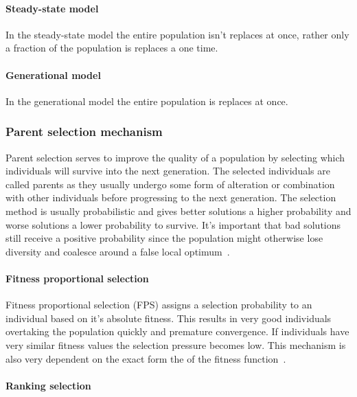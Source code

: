 \paragraph{Steady-state model}

In the steady-state model the entire population isn't replaces at once, rather only a fraction of the population is replaces a one time.

\paragraph{Generational model}

In the generational model the entire population is replaces at once.

\subsubsection{Parent selection mechanism}

Parent selection serves to improve the quality of a population by selecting which individuals will survive into the next generation. The selected individuals are called parents as they usually undergo some form of alteration or combination with other individuals before progressing to the next generation. The selection method is usually probabilistic and gives better solutions a higher probability and worse solutions a lower probability to survive. It's important that bad solutions still receive a positive probability since the population might otherwise lose diversity and coalesce around a false local optimum~\cite{Eiben2015_whatevolutionary}.



\paragraph{Fitness proportional selection}

Fitness proportional selection (FPS) assigns a selection probability to an individual based on it's absolute fitness. This results in very good individuals overtaking the population quickly and premature convergence. If individuals have very similar fitness values the selection pressure becomes low. This mechanism is also very dependent on the exact form the of the fitness function~\cite{Eiben2015asdfasd}.

\paragraph{Ranking selection}

